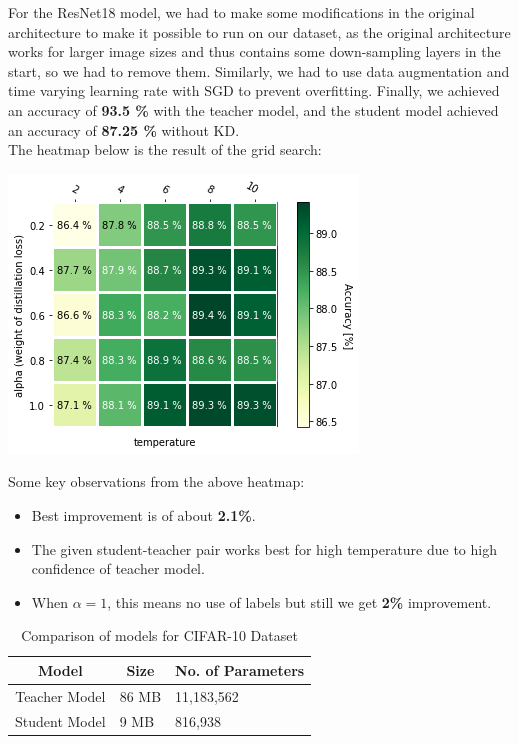 \documentclass{article} %
\begin{document}
	For the ResNet18 model, we had to make some modifications in the original architecture to make it possible to run on our dataset, as the original architecture works for larger image sizes and thus contains some down-sampling layers in the start, so we had to remove them. Similarly, we had to use data augmentation and time varying learning rate with SGD to prevent overfitting.
	Finally, we achieved an accuracy of \textbf{93.5 \%} with the teacher model, and the student model achieved an accuracy of \textbf{87.25 \%} without KD.\\
	The heatmap below is the result of the grid search:
	
	\begin{center}
		\includegraphics[width=0.7\linewidth]{fig/kd_2.png}
	\end{center}
	
	Some key observations from the above heatmap:
	\begin{itemize}
		\item Best improvement is of about \textbf{2.1\%}.
		
		\item The given student-teacher pair works best for high temperature due to high confidence of teacher model.
		
		\item When $\alpha = 1$, this means no use of labels but still we get \textbf{2\%} improvement.
	\end{itemize}
	
	
	\begin{table}[!htbp]
		\centering
		\caption{Comparison of models for CIFAR-10 Dataset}
		\label{tab:my-table}
		\begin{tabular}{@{}cll@{}}
			\toprule
			\textbf{Model} & \multicolumn{1}{c}{\textbf{Size}} & \multicolumn{1}{c}{\textbf{No. of Parameters}} \\ \midrule
			Teacher Model  & 86 MB                           & 11,183,562
			\\
			Student Model  & 9 MB                            & 816,938                                        \\ \bottomrule
		\end{tabular}
	\end{table}
	
\end{document}

